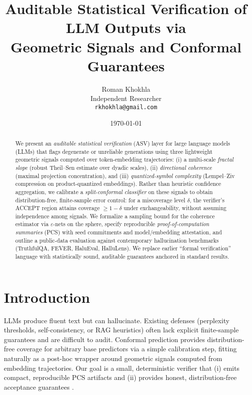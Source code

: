 \documentclass[11pt]{article}
\title{Auditable Statistical Verification of LLM Outputs via\\ Geometric Signals and Conformal Guarantees}
\author{Roman Khokhla\\ \small Independent Researcher\\ \small \texttt{rkhokhla@gmail.com}}
\date{\today}
\begin{document}
\maketitle

\begin{abstract}
We present an \emph{auditable statistical verification} (ASV) layer for large language models (LLMs) that flags degenerate or unreliable generations using three lightweight geometric signals computed over token-embedding trajectories: (i) a multi-scale \emph{fractal slope} (robust Theil--Sen estimate over dyadic scales), (ii) \emph{directional coherence} (maximal projection concentration), and (iii) \emph{quantized-symbol complexity} (Lempel--Ziv compression on product-quantized embeddings). Rather than heuristic confidence aggregation, we calibrate a \emph{split-conformal classifier} on these signals to obtain distribution-free, finite-sample error control: for a miscoverage level $\delta$, the verifier's \textsc{ACCEPT} region attains coverage $\ge 1-\delta$ under exchangeability, without assuming independence among signals. We formalize a sampling bound for the coherence estimator via $\varepsilon$-nets on the sphere, specify reproducible \emph{proof-of-computation summaries} (PCS) with seed commitments and model/embedding attestation, and outline a public-data evaluation against contemporary hallucination benchmarks (TruthfulQA, FEVER, HaluEval, HalluLens). We replace earlier ``formal verification'' language with statistically sound, auditable guarantees anchored in standard results.
\end{abstract}

\section{Introduction}
LLMs produce fluent text but can hallucinate. Existing defenses (perplexity thresholds, self-consistency, or RAG heuristics) often lack explicit finite-sample guarantees and are difficult to audit. Conformal prediction provides distribution-free coverage for arbitrary base predictors via a simple calibration step, fitting naturally as a post-hoc wrapper around geometric signals computed from embedding trajectories. Our goal is a small, deterministic verifier that (i) emits compact, reproducible PCS artifacts and (ii) provides honest, distribution-free acceptance guarantees \citep{angelopoulos2023gentle,shafer2008tutorial}.
\end{document}
